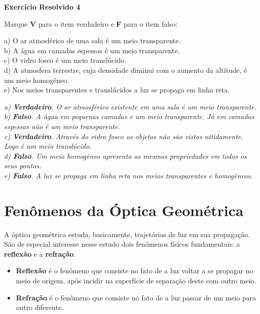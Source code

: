 \documentclass[11pt,twocolumn,oneside]{article}
\newenvironment{resposta*}
  {\bf Resposta:\\ }
  {}
\begin{document}
\textbf{Exercício Resolvido 4}


Marque \textbf{V} para o item verdadeiro e \textbf{F} para o item falso:


a) O ar atmosférico de uma sala é um meio transparente. \\
b) A água em camadas espessas é um meio transparente. \\
c) O vidro fosco é um meio translúcido. \\
d) A atmosfera terrestre, cuja densidade diminui com o aumento da altitude, é um meio homogêneo. \\
e) Nos meios transparentes e translúcidos a luz se propaga em linha reta.


\begin{resposta*}
{\it a) \textbf{Verdadeiro}. O ar atmosférico existente em uma sala é um meio transparente. \\
b) \textbf{Falso}. A água em pequenas camadas e um meio transparente. Já em camadas espessas não é um meio transparente. \\
c) \textbf{Verdadeiro}. Através do vidro fosco os objetos não são vistos nitidamente. Logo é um meio translúcido. \\
d) \textbf{Falso}. Um meio homogêneo apresenta as mesmas propriedades em todos os seus pontos. \\
e) \textbf{Falso}. A luz se propaga em linha reta nos meios transparentes e homogêneos.}
\end{resposta*}

\hypertarget{x-fenômenos-da-óptica-geométrica}{\section{Fenômenos da Óptica Geométrica}}
A óptica geométrica estuda, basicamente, trajetórias de luz em sua propagação. São de especial interesse nesse estudo dois fenômenos físicos fundamentais: a \textbf{reflexão} e a \textbf{refração}.


\begin{itemize}

\item \textbf{Reflexão} é o fenômeno que consiste no fato de a luz voltar a se propagar no meio de origem, após incidir na superfície de separação deste com outro meio.

\item \textbf{Refração} é o fenômeno que consiste no fato de a luz passar de um meio para outro diferente.

\end{itemize}
\end{document}

